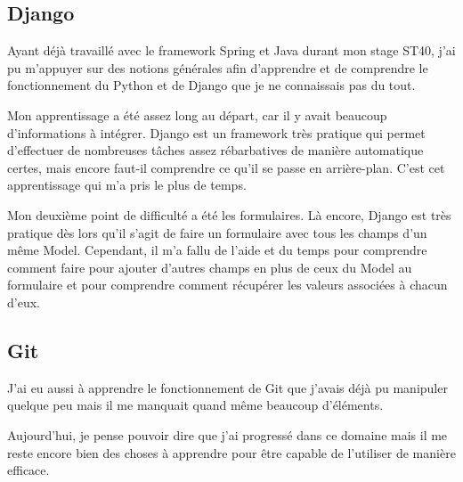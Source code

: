 \documentclass[a4paper]{report}
\begin{document}
\subsection{Django}
\par Ayant déjà travaillé avec le framework Spring et Java durant mon stage ST40, j’ai pu m’appuyer sur des notions générales afin d’apprendre et de comprendre le fonctionnement du Python et de Django que je ne connaissais pas du tout.

\par Mon apprentissage a été assez long au départ, car il y avait beaucoup d’informations à intégrer. Django est un framework très pratique qui permet d’effectuer de nombreuses tâches assez rébarbatives de manière automatique certes, mais encore faut-il comprendre ce qu’il se passe en arrière-plan. C’est cet apprentissage qui m’a pris le plus de temps.

\par Mon deuxième point de difficulté a été les formulaires. Là encore, Django est très pratique dès lors qu’il s’agit de faire un formulaire avec tous les champs d’un même Model. Cependant, il m’a fallu de l’aide et du temps pour comprendre comment faire pour ajouter d’autres champs en plus de ceux du Model au formulaire et pour comprendre comment récupérer les valeurs associées à chacun d’eux.

\subsection{Git}
\par J’ai eu aussi à apprendre le fonctionnement de Git que j’avais déjà pu manipuler quelque peu mais il me manquait quand même beaucoup d’éléments.

\par Aujourd’hui, je pense pouvoir dire que j’ai progressé dans ce domaine mais il me reste encore bien des choses à apprendre pour être capable de l’utiliser de manière efficace.
\end{document}
